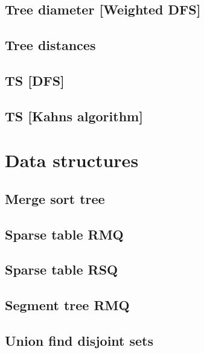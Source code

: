 \subsection{Tree diameter [Weighted DFS]}
\raggedbottom
\hrulefill
\subsection{Tree distances}
\raggedbottom
\hrulefill
\subsection{TS [DFS]}
\raggedbottom
\hrulefill
\subsection{TS [Kahns algorithm]}
\raggedbottom
\hrulefill


\section{Data structures}
\subsection{Merge sort tree}
\raggedbottom
\hrulefill
\subsection{Sparse table RMQ}
\raggedbottom
\hrulefill
\subsection{Sparse table RSQ}
\raggedbottom
\hrulefill
\subsection{Segment tree RMQ}
\raggedbottom
\hrulefill
\subsection{Union find disjoint sets}
\raggedbottom
\hrulefill
